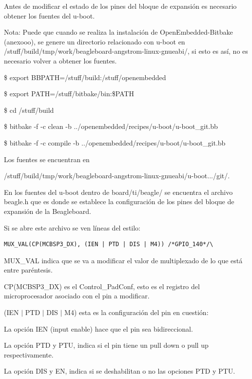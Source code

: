 Antes de modificar el estado de los pines del bloque de expansión es necesario obtener los fuentes del u-boot.

Nota: Puede que cuando se realiza la instalación de OpenEmbedded-Bitbake (anexooo), se genere un directorio relacionado con u-boot en /stuff/build/tmp/work/beagleboard-angstrom-linux-gnueabi/, si esto es así, no es necesario volver a obtener los fuentes.

\bigskip
{}

\centerline{\$ export BBPATH=/stuff/build:/stuff/openembedded}

\centerline{\$ export PATH=/stuff/bitbake/bin:\$PATH}

\bigskip
{}

\centerline{\$ cd /stuff/build}

\centerline{\$ bitbake -f -c clean -b ../openembedded/recipes/u-boot/u-boot\_git.bb}

\centerline{\$ bitbake -f -c compile -b ../openembedded/recipes/u-boot/u-boot\_git.bb}

\bigskip
Los fuentes se encuentran en 

/stuff/build/tmp/work/beagleboard-angstrom-linux-gnueabi/u-boot.../git/.

\bigskip
En los fuentes del u-boot dentro de board/ti/beagle/ se encuentra el archivo beagle.h que es donde se establece la configuración de los pines del bloque de expansión de la Beagleboard.

Si se abre este archivo se ven líneas del estilo: 

\begin{verbatim}
MUX_VAL(CP(MCBSP3_DX), (IEN | PTD | DIS | M4)) /*GPIO_140*/\
\end{verbatim}

MUX\_VAL indica que se va a modificar el valor de multiplexado de lo que está entre paréntesis. 

\bigskip
CP(MCBSP3\_DX) es el Control\_PadConf, esto es el registro del microprocesador asociado con el 
pin a modificar. 

\bigskip
(IEN $|$ PTD $|$ DIS $|$ M4) esta es la configuración del pin en cuestión: 


La opción IEN (input enable) hace que el pin sea bidireccional. 

La opción PTD y PTU, indica si el pin tiene un pull down o pull up respectivamente. 

La opción DIS y EN, indica si se deshabilitan o no las opciones PTD y PTU. 


